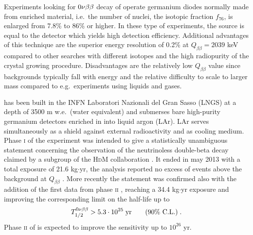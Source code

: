 Experiments looking for $0\nu\beta\beta$ decay of  operate germanium diodes normally made from enriched material, i.e.~the number of  nuclei, the isotopic fraction $f_{76}$, is enlarged from 7.8\% to 86\% or higher. In these type of experiments, the source is equal to the detector which yields high detection efficiency. Additional advantages of this technique are the superior energy resolution of 0.2\% at $Q_{\beta\beta}=2039$ keV compared to other searches with different isotopes and the high radiopurity of the crystal growing procedure. Disadvantages are the relatively low $Q_{\beta\beta}$ value since backgrounds typically fall with energy and the relative difficulty to scale to larger mass compared to e.g.~experiments using liquids and gases.

{\gerda} has been built in the INFN Laboratori Nazionali del Gran Sasso (LNGS) at a depth of 3500 m w.e.~(water equivalent) and submerses bare high-purity germanium detectors enriched in  into liquid argon (LAr). LAr serves simultaneously as a shield against external radioactivity and as cooling medium. Phase \textsc{i} of the experiment was intended to give a statistically unambiguous statement concerning the observation of the neutrinoless double-beta decay claimed by a subgroup of the \textsc{HdM} collaboration \cite{hdmclaim}. It ended in may 2013 with a total exposure of 21.6 kg$\cdot$yr, the analysis reported no excess of events above the background at $Q_{\beta\beta}$ \cite{resultsphase1}. More recently the statement was confirmed also with the addition of the first data from phase \textsc{ii} \cite{nature}, reaching a 34.4 kg$\cdot$yr exposure and improving the corresponding limit on the half-life up to
\[T_{1/2}^{0\nu\beta\beta}>5.3\cdot10^{25}\;\text{yr}\qquad\text{(90\% C.L.)}\;.\]
Phase \textsc{ii} of {\gerda} is expected to improve the sensitivity up to $10^{26}$ yr.

